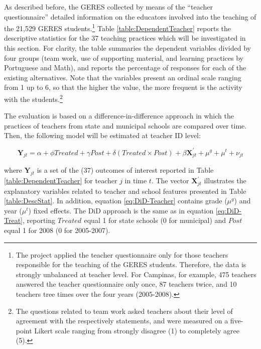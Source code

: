 \documentclass[a4paper, 12pt]{article}
\begin{document}
As described before, the GERES collected by means of the ``teacher questionnaire'' detailed information on the educators involved into the teaching of the 21,529 GERES students.\footnote{The project applied the teacher questionnaire only for those teachers responsible for the teaching of the GERES students. Therefore, the data is strongly unbalanced at teacher level. For Campinas, for example, 475 teachers answered the teacher questionnaire only once, 87 teachers twice, and 10 teachers tree times over the four years (2005-2008).} Table \ref{table:DependentTeacher} reports the descriptive statistics for the 37 teaching practices which will be investigated in this section. For clarity, the table summaries the dependent variables divided by four groups (team work, use of supporting material, and learning practices by Portuguese and Math), and reports the percentage of responses for each of the existing alternatives. Note that the variables present an ordinal scale ranging from 1 up to 6, so that the higher the value, the more frequent is the activity with the students.\footnote{The questions related to team work asked teachers about their level of agreement with the respectively statements, and were measured on a five-point Likert scale ranging from strongly disagree (1) to completely agree (5).}


The evaluation is based on a difference-in-difference approach in which the practices of teachers from state and municipal schools are compared over time. Then, the following model will be estimated at teacher ID level:


\begin{equation} \label{eq:DiD-Teacher}
\mathbf{Y}_{jt} = \alpha + \phi Treated + \gamma Post + \delta (Treated \times Post)_{} + \beta \mathbf{X}_{jt}^{\prime} + \mu^g + \mu^t +  \nu_{jt} 
\end{equation}





where $\mathbf{Y}_{jt}$ is a set of the (37) outcomes of interest reported in Table \ref{table:DependentTeacher} for teacher $j$ in time $t$. The vector $\mathbf{X}_{jt}^{\prime}$ illustrates the explanatory variables related to teacher and school features presented in Table \ref{table:DescStat}. In addition, equation \eqref{eq:DiD-Teacher} contains grade ($\mu^{g}$) and year ($\mu^t$) fixed effects. The DiD approach is the same as in equation \eqref{eq:DiD-Treat}, reporting $Treated_{}$ equal 1 for state schools (0 for municipal) and $Post_{}$ equal 1 for 2008 (0 for 2005-2007).
\end{document}
